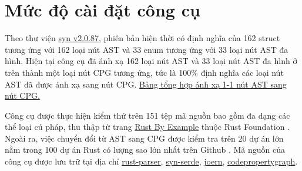 \section{Mức độ cài đặt công cụ}

Theo thư viện \href{https://docs.rs/syn/2.0.87/syn/}{syn v2.0.87}, phiên bản hiện thời có định nghĩa của 162 struct tương ứng với 162 loại nút AST và 33 enum tương ứng với 33 loại nút AST đa hình.
Hiện tại công cụ đã ánh xạ 162 loại nút AST và 33 loại nút AST đa hình ở trên thành một loại nút CPG tương ứng, tức là 100\% định nghĩa các loại nút AST đã được ánh xạ sang nút CPG.
\href{https://github.com/congnghiahieu/rust-parser/blob/master/docs/MAPPING.md}{Bảng tổng hợp ánh xạ 1-1 nút AST sang nút CPG.}

Công cụ được thực hiện kiểm thử trên 151 tệp mã nguồn bao gồm đa dạng các thể loại cú pháp, thu thập từ trang \href{https://doc.rust-lang.org/stable/rust-by-example/index.html}{Rust By Example} thuộc Rust Foundation \cite{rustlangRustFoundation}.
Ngoài ra, việc chuyển đổi từ AST sang CPG được kiểm tra trên 20 dự án lớn nằm trong 100 dự án Rust có lượng sao lớn nhất trên Github \cite {githubGithubRankingTop100RustmdMaster}.
Mã nguồn của công cụ được lưu trữ tại địa chỉ \href{https://github.com/congnghiahieu/rust-parser}{rust-parser}, \href{https://github.com/congnghiahieu/syn-serde}{syn-serde}, \href{https://github.com/congnghiahieu/joern}{joern}, \href{https://github.com/congnghiahieu/codepropertygraph}{codepropertygraph}.

